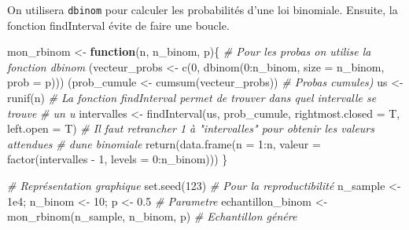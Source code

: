 \documentclass[
]{article}
\newenvironment{Shaded}{\begin{snugshade}}{\end{snugshade}}
\newcommand{\AttributeTok}[1]{\textcolor[rgb]{0.77,0.63,0.00}{#1}}
\newcommand{\CommentTok}[1]{\textcolor[rgb]{0.56,0.35,0.01}{\textit{#1}}}
\newcommand{\ControlFlowTok}[1]{\textcolor[rgb]{0.13,0.29,0.53}{\textbf{#1}}}
\newcommand{\DecValTok}[1]{\textcolor[rgb]{0.00,0.00,0.81}{#1}}
\newcommand{\FloatTok}[1]{\textcolor[rgb]{0.00,0.00,0.81}{#1}}
\newcommand{\FunctionTok}[1]{\textcolor[rgb]{0.00,0.00,0.00}{#1}}
\newcommand{\NormalTok}[1]{#1}
\newcommand{\OtherTok}[1]{\textcolor[rgb]{0.56,0.35,0.01}{#1}}
\newcommand{\SpecialCharTok}[1]{\textcolor[rgb]{0.00,0.00,0.00}{#1}}
\newenvironment{Correction}%
  { \vspace{\baselineskip}\begin{mdframed}[backgroundcolor=my_green]}%
  {\end{mdframed}}
\begin{document}
\begin{Correction}

On utilisera \texttt{dbinom} pour calculer les probabilités d'une loi binomiale.
Ensuite, la fonction findInterval évite de faire une boucle.

\end{Correction}

\begin{Shaded}
\begin{Highlighting}[]
\NormalTok{mon\_rbinom }\OtherTok{\textless{}{-}} \ControlFlowTok{function}\NormalTok{(n, n\_binom, p)\{}
  \CommentTok{\# Pour les probas on utilise la fonction dbinom}
\NormalTok{  (vecteur\_probs }\OtherTok{\textless{}{-}} \FunctionTok{c}\NormalTok{(}\DecValTok{0}\NormalTok{, }\FunctionTok{dbinom}\NormalTok{(}\DecValTok{0}\SpecialCharTok{:}\NormalTok{n\_binom, }\AttributeTok{size =}\NormalTok{ n\_binom, }\AttributeTok{prob =}\NormalTok{ p)))}
\NormalTok{  (prob\_cumule }\OtherTok{\textless{}{-}} \FunctionTok{cumsum}\NormalTok{(vecteur\_probs)) }\CommentTok{\# Probas cumules)}
\NormalTok{  us }\OtherTok{\textless{}{-}} \FunctionTok{runif}\NormalTok{(n)}
  \CommentTok{\# La fonction findInterval permet de trouver dans quel intervalle se trouve}
  \CommentTok{\# un u}
\NormalTok{  intervalles }\OtherTok{\textless{}{-}} \FunctionTok{findInterval}\NormalTok{(us, prob\_cumule, }\AttributeTok{rightmost.closed =}\NormalTok{ T,}
                              \AttributeTok{left.open =}\NormalTok{ T)}
  \CommentTok{\# Il faut retrancher 1 à "intervalles" pour obtenir les valeurs attendues}
  \CommentTok{\# d\textquotesingle{}une binomiale}
  \FunctionTok{return}\NormalTok{(}\FunctionTok{data.frame}\NormalTok{(}\AttributeTok{n =} \DecValTok{1}\SpecialCharTok{:}\NormalTok{n,}
                    \AttributeTok{valeur =} \FunctionTok{factor}\NormalTok{(intervalles }\SpecialCharTok{{-}} \DecValTok{1}\NormalTok{, }\AttributeTok{levels =} \DecValTok{0}\SpecialCharTok{:}\NormalTok{n\_binom)))}
\NormalTok{\}}
\end{Highlighting}
\end{Shaded}

\begin{Shaded}
\begin{Highlighting}[]
\CommentTok{\# Représentation graphique}
\FunctionTok{set.seed}\NormalTok{(}\DecValTok{123}\NormalTok{) }\CommentTok{\# Pour la reproductibilité}
\NormalTok{n\_sample }\OtherTok{\textless{}{-}} \FloatTok{1e4}\NormalTok{; n\_binom }\OtherTok{\textless{}{-}} \DecValTok{10}\NormalTok{; p }\OtherTok{\textless{}{-}} \FloatTok{0.5} \CommentTok{\# Parametre}
\NormalTok{echantillon\_binom }\OtherTok{\textless{}{-}} \FunctionTok{mon\_rbinom}\NormalTok{(n\_sample, n\_binom, p) }\CommentTok{\# Echantillon génére}
\end{Highlighting}
\end{Shaded}
\end{document}
